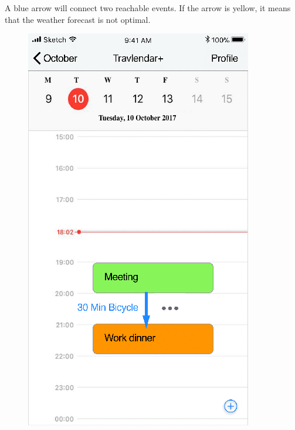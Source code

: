 \newpage
{}
A blue arrow will connect two reachable events. If the arrow is yellow, it means that the weather forecast is not optimal.
\begin{figure}[H]
	\centering
	\includegraphics[scale=0.23]{Images/Interface/Weather_Forecast/1_optimal}
	\hspace{0.5cm}

\end{figure}
